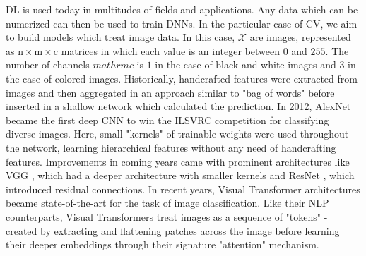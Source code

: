 \ac{DL} is used today in multitudes of fields and applications. Any data which can be numerized 
can then be used to train \ac{DNN}s. In the particular case of \ac{CV}, we aim to build models 
which treat image data. In this case, $\mathcal{X}$ are images, represented as 
$\mathrm{n} \times \mathrm{m} \times \mathrm{c}$ matrices in which each value is an integer 
between $0$ and $255$. The number of channels $mathrm{c}$ is $1$ in the case of black and white 
images and $3$
in the case of colored images. Historically, handcrafted features were extracted from images and 
then aggregated in an approach similar to "bag of words" \citep{lowe2004distinctive, ahonen2004face, dalal2005histograms}
before inserted in a shallow network which calculated the prediction. In 2012, AlexNet \citep{krizhevsky2012imagenet}
became the first deep \ac{CNN} to win the \ac{ILSVRC} competition for classifying diverse images.
Here, small "kernels" of trainable weights were used throughout the network, learning hierarchical 
features without any need of handcrafting features.
Improvements in coming years came with prominent architectures like VGG \citep{simonyan2014very}, which 
had a deeper architecture with smaller kernels 
and ResNet \citep{he2016resnet}, which introduced residual connections. In recent years, 
Visual Transformer architectures \citep{dosovitskiy2020vit, touvron2021deit, chen2022pali} became state-of-the-art for the task of 
image classification. Like their \ac{NLP} counterparts, Visual Transformers treat images 
as a sequence of "tokens" - created by extracting and flattening patches across the image before 
learning their deeper embeddings through their signature "attention" mechanism. 








